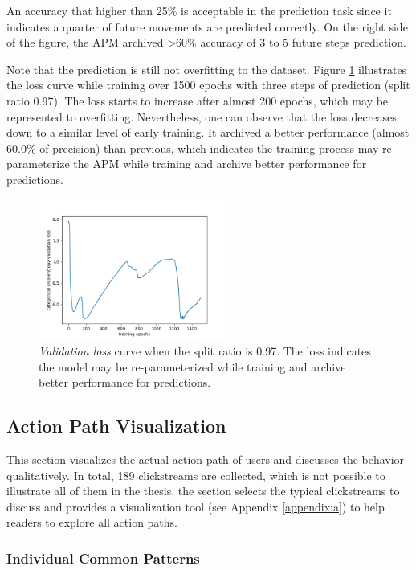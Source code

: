 An accuracy that higher than 25\% is acceptable in the prediction task since it indicates
a quarter of future movements are predicted correctly.
On the right side of the figure, the APM archived >60\% accuracy of 3 to 5 future steps prediction.

Note that the prediction is still not overfitting to the dataset. Figure \ref{fig:loss}
illustrates the loss curve while training over 1500 epochs with three steps of prediction (split ratio 0.97).
The loss starts to increase after almost 200 epochs, which may be represented to overfitting.
Nevertheless, one can observe that the loss decreases down to a similar level of early training.
It archived a better performance (almost 60.0\% of precision) than previous, which indicates
the training process may re-parameterize the APM while training and archive better performance
for predictions.

\begin{figure}[H]
    \centering
    \includegraphics[width=0.55\textwidth]{figures/loss2}
    \caption{\emph{Validation loss} curve when the split ratio is 0.97. The loss indicates
    the model may be re-parameterized while training and archive better performance
    for predictions.}
    \label{fig:loss}
\end{figure}

\subsection{Action Path Visualization}

This section visualizes the actual action path of users and discusses the behavior qualitatively.
In total, 189 clickstreams are collected, which is not possible to illustrate all of them
in the thesis, the section selects the typical clickstreams to discuss and provides a visualization tool
(see Appendix \ref{appendix:a}) to help readers to explore all action paths.

\subsubsection{Individual Common Patterns}

